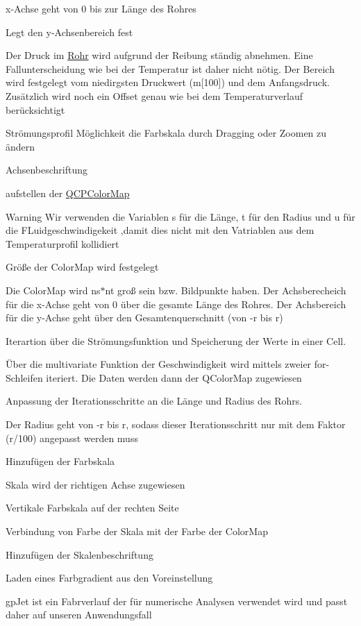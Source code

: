 x-\/\+Achse geht von 0 bis zur Länge des Rohres

Legt den y-\/\+Achsenbereich fest

Der Druck im \hyperlink{class_rohr}{Rohr} wird aufgrund der Reibung ständig abnehmen. Eine Fallunterscheidung wie bei der Temperatur ist daher nicht nötig. Der Bereich wird festgelegt vom niedirgsten Druckwert (m\mbox{[}100\mbox{]}) und dem Anfangsdruck. Zusätzlich wird noch ein Offset genau wie bei dem Temperaturverlauf berücksichtigt

Strömungsprofil Möglichkeit die Farbskala durch Dragging oder Zoomen zu ändern

Achsenbeschriftung

aufstellen der \hyperlink{class_q_c_p_color_map}{Q\+C\+P\+Color\+Map} \begin{DoxyWarning}{Warning}
Wir verwenden die Variablen s für die Länge, t für den Radius und u für die F\+Luidgeschwindigekeit ,damit dies nicht mit den Vatriablen aus dem Temperaturprofil kollidiert
\end{DoxyWarning}
Größe der Color\+Map wird festgelegt

Die Color\+Map wird ns$\ast$nt groß sein bzw. Bildpunkte haben. Der Achsberecheich für die x-\/\+Achse geht von 0 über die gesamte Länge des Rohres. Der Achsbereich für die y-\/\+Achse geht über den Gesamtenquerschnitt (von -\/r bis r)

Iterartion über die Strömungsfunktion und Speicherung der Werte in einer Cell.

Über die multivariate Funktion der Geschwindigkeit wird mittels zweier for-\/\+Schleifen iteriert. Die Daten werden dann der Q\+Color\+Map zugewiesen

Anpassung der Iterationsschritte an die Länge und Radius des Rohrs.

Der Radius geht von -\/r bis r, sodass dieser Iterationsschritt nur mit dem Faktor (r/100) angepasst werden muss

Hinzufügen der Farbskala

Skala wird der richtigen Achse zugewiesen

Vertikale Farbskala auf der rechten Seite

Verbindung von Farbe der Skala mit der Farbe der Color\+Map

Hinzufügen der Skalenbeschriftung

Laden eines Farbgradient aus den Voreinstellung

gp\+Jet ist ein Fabrverlauf der für numerische Analysen verwendet wird und passt daher auf unseren Anwendungsfall

